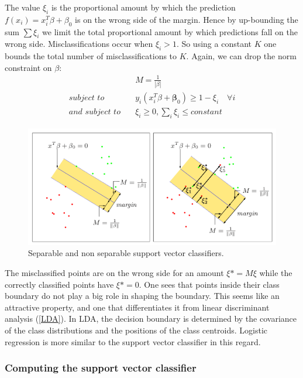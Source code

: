 \documentclass[12pt, letterpaper]{article}
\theoremstyle{definition}
\newcommand{\be}{\mathbf{\beta}}
\begin{document}
The value $\xi_i$ is the proportional amount by which the prediction $f(x_i) = x_i^T\beta+\beta_0$ is on the wrong side of the margin. Hence by up-bounding the sum $\sum \xi_i$ we limit the total proportional amount by which predictions fall on the wrong side. Misclassifications occur when $\xi_i> 1$. So using  a constant $K$ one bounds the total number of misclassifications to $K$. Again, we can drop the norm constraint on $\beta$:
\begin{equation}
\begin{aligned}
&M = \frac{1}{\left| \beta\right|}\\
\textit{subject to} \quad &y_i(x_i^T\beta +\be_0) \ge 1-\xi_i \quad \forall i\\
\textit{and subject to} \quad & \xi_i \ge 0, \sum_i \xi_i \le constant
\end{aligned}
\label{SVMOpt}
\end{equation}
\begin{figure}
\centering
\includegraphics[scale=0.5]{img/SVM}
\caption{Separable and non separable support vector classifiers.}
\end{figure}
The misclassified points are on the wrong side for an amount $\xi* = M \xi$ while the correctly classified points have $\xi*=0$. One sees that points inside their class boundary do not play a big role in shaping the boundary. This seems like an attractive property, and one that differentiates it from linear discriminant analysis (\ref{LDA}). In LDA, the decision boundary is determined by the covariance of the class distributions and the positions of the class centroids. Logistic regression is more similar to the support vector classifier in this regard.
\subsubsection{Computing the support vector classifier}
\end{document}
